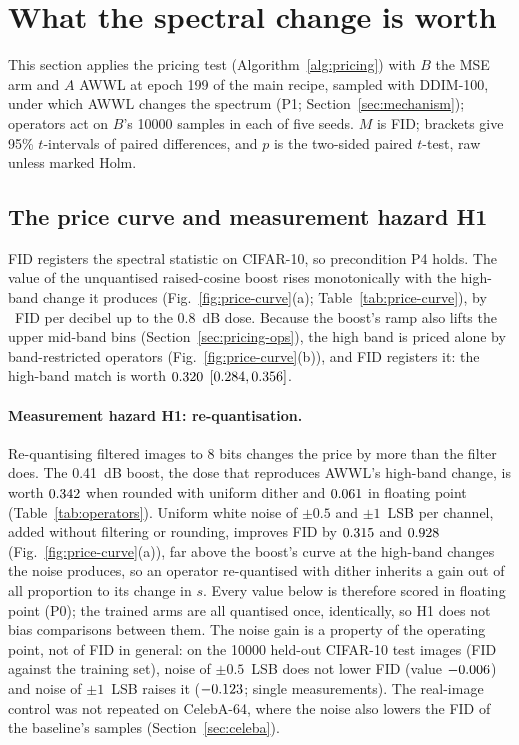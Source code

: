 \section{What the spectral change is worth}
\label{sec:worth}

This section applies the pricing test (Algorithm~\ref{alg:pricing}) with $B$
the MSE arm and $A$ AWWL at epoch 199 of the main recipe, sampled with
DDIM-100, under which AWWL changes the spectrum (P1;
Section~\ref{sec:mechanism}); operators act on $B$'s \num{10000} samples in
each of five seeds. $M$ is FID; brackets give 95\% $t$-intervals of paired
differences, and $p$ is the two-sided paired $t$-test, raw unless marked Holm.

\subsection{The price curve and measurement hazard H1}
\label{sec:worth-curve}

FID registers the spectral statistic on CIFAR-10, so precondition P4 holds.
The value of the unquantised raised-cosine boost rises monotonically
with the high-band change it produces
(Fig.~\ref{fig:price-curve}(a); Table~\ref{tab:price-curve}), by
\priceBoostPerDB~FID per decibel up to the 0.8~dB dose. Because the boost's
ramp also lifts the upper mid-band bins (Section~\ref{sec:pricing-ops}), the
high band is priced alone by band-restricted operators
(Fig.~\ref{fig:price-curve}(b)), and FID registers it: the high-band match is
worth $0.320$ $[0.284, 0.356]$.

\paragraph{Measurement hazard H1: re-quantisation.}
Re-quantising filtered images to 8 bits changes the price by more than the
filter does. The 0.41~dB boost, the dose that reproduces AWWL's high-band
change, is worth $0.342$ when rounded with uniform dither and
$0.061$ in floating point (Table~\ref{tab:operators}). Uniform
white noise of $\pm0.5$ and $\pm1$~LSB per channel, added without filtering
or rounding, improves FID by $0.315$ and $0.928$
(Fig.~\ref{fig:price-curve}(a)), far above the boost's curve at the high-band changes the noise produces, so an operator re-quantised with
dither inherits a gain out of all proportion to its change in $s$. Every
value below is therefore scored in floating point (P0); the trained arms are
all quantised once, identically, so H1 does not bias comparisons between
them. The noise gain is a property of the operating point, not of FID in
general: on the \num{10000} held-out CIFAR-10 test images (FID
\realTestFID{} against the training set), noise of $\pm0.5$~LSB does not
lower FID (value $-0.006$) and noise of $\pm1$~LSB raises it
($-0.123$; single measurements). The real-image control was not
repeated on CelebA-64, where the noise also lowers the FID of the baseline's
samples (Section~\ref{sec:celeba}).

